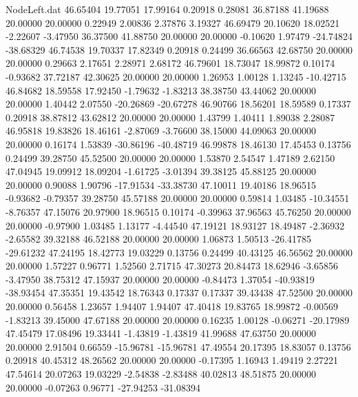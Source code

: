 \begin{filecontents}{NodeLeft.dat}
  46.65404   19.77051   17.99164     0.20918    0.28081   36.87188   41.19688   20.00000   20.00000    0.22949    2.00836    2.37876    3.19327
  46.69479   20.10620   18.02521    -2.22607   -3.47950   36.37500   41.88750   20.00000   20.00000   -0.10620    1.97479  -24.74824  -38.68329
  46.74538   19.70337   17.82349     0.20918    0.24499   36.66563   42.68750   20.00000   20.00000    0.29663    2.17651    2.28971    2.68172
  46.79601   18.73047   18.99872     0.10174   -0.93682   37.72187   42.30625   20.00000   20.00000    1.26953    1.00128    1.13245  -10.42715
  46.84682   18.59558   17.92450    -1.79632   -1.83213   38.38750   43.44062   20.00000   20.00000    1.40442    2.07550  -20.26869  -20.67278
  46.90766   18.56201   18.59589     0.17337    0.20918   38.87812   43.62812   20.00000   20.00000    1.43799    1.40411    1.89038    2.28087
  46.95818   19.83826   18.46161    -2.87069   -3.76600   38.15000   44.09063   20.00000   20.00000    0.16174    1.53839  -30.86196  -40.48719
  46.99878   18.46130   17.45453     0.13756    0.24499   39.28750   45.52500   20.00000   20.00000    1.53870    2.54547    1.47189    2.62150
  47.04945   19.09912   18.09204    -1.61725   -3.01394   39.38125   45.88125   20.00000   20.00000    0.90088    1.90796  -17.91534  -33.38730
  47.10011   19.40186   18.96515    -0.93682   -0.79357   39.28750   45.57188   20.00000   20.00000    0.59814    1.03485  -10.34551   -8.76357
  47.15076   20.97900   18.96515     0.10174   -0.39963   37.96563   45.76250   20.00000   20.00000   -0.97900    1.03485    1.13177   -4.44540
  47.19121   18.93127   18.49487    -2.36932   -2.65582   39.32188   46.52188   20.00000   20.00000    1.06873    1.50513  -26.41785  -29.61232
  47.24195   18.42773   19.03229     0.13756    0.24499   40.43125   46.56562   20.00000   20.00000    1.57227    0.96771    1.52560    2.71715
  47.30273   20.84473   18.62946    -3.65856   -3.47950   38.75312   47.15937   20.00000   20.00000   -0.84473    1.37054  -40.93819  -38.93454
  47.35351   19.43542   18.76343     0.17337    0.17337   39.43438   47.52500   20.00000   20.00000    0.56458    1.23657    1.94407    1.94407
  47.40418   19.83765   18.99872    -0.00569   -1.83213   39.45000   47.67188   20.00000   20.00000    0.16235    1.00128   -0.06271  -20.17989
  47.45479   17.08496   19.33441    -1.43819   -1.43819   41.99688   47.63750   20.00000   20.00000    2.91504    0.66559  -15.96781  -15.96781
  47.49554   20.17395   18.83057     0.13756    0.20918   40.45312   48.26562   20.00000   20.00000   -0.17395    1.16943    1.49419    2.27221
  47.54614   20.07263   19.03229    -2.54838   -2.83488   40.02813   48.51875   20.00000   20.00000   -0.07263    0.96771  -27.94253  -31.08394

\end{filecontents}
